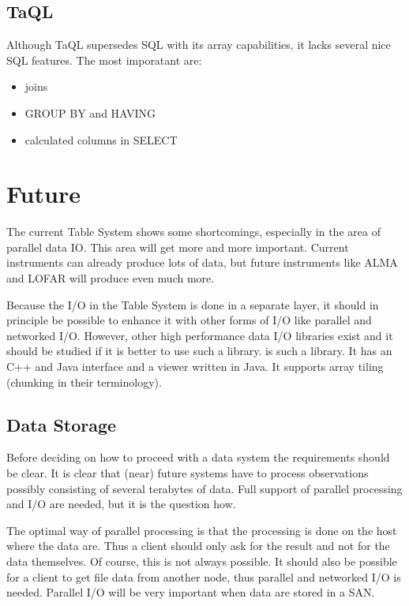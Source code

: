 \subsection{TaQL}
Although TaQL supersedes SQL with its array capabilities, it lacks
several nice SQL features. The most imporatant are:
\begin{itemize}
\item joins
\item GROUP BY and HAVING
\item calculated columns in SELECT
\end{itemize}


\section{Future}
The current Table System shows some shortcomings, especially in the
area of parallel data IO. This area will get more and more important.
Current instruments can already produce lots of data, but future
instruments like ALMA and LOFAR will produce even much more.

Because the I/O in the Table System is done in a separate layer, it
should in principle be possible to enhance it with other forms of
I/O like parallel and networked I/O. However, other high
performance data I/O libraries
exist and it should be studied if it is better to use such a library.
 is such a
library. It has an C++ and Java interface and a viewer written in
Java. It supports array tiling (chunking in their terminology).

\subsection{Data Storage}
Before deciding on how to proceed with a data system the requirements 
should be clear.
It is clear that (near) future systems have to process observations
possibly consisting of several terabytes of data. Full support of
parallel processing and I/O are needed, but it is the question how.

The optimal way of parallel processing is that the processing is done
on the host where the data are. Thus a client should only ask for the
result and not for the data themselves. Of course, this is not always
possible. It should also be possible for a client to get file data
from another node, thus parallel and networked I/O is needed.
Parallel I/O will be very important when data are stored in a SAN.

